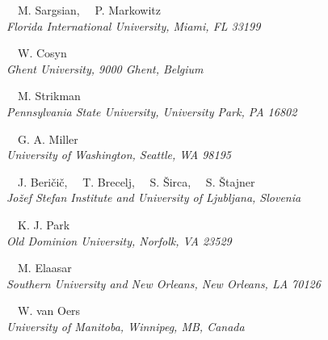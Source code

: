 \begin{center}
\vspace{10px}

{~~M. Sargsian,
~~P. Markowitz}\\
\ls
{\normalsize\it{Florida International University, Miami, FL 33199}}

\vspace{10px}

{~~W. Cosyn}\\
\ls
{\normalsize\it{Ghent University, 9000 Ghent, Belgium}}

\vspace{10px}

{~~M. Strikman}\\
\ls
{\normalsize\it{Pennsylvania State University, University Park, PA 16802}}

\vspace{10px}

{~~G. A. Miller}\\
\ls
{\normalsize\it{University of Washington, Seattle, WA 98195}}

\vspace{10px}

{~~J. Beri\v{c}i\v{c}, 
~~T. Brecelj, 
~~S. \v{S}irca, 
~~S. \v{S}tajner} \\
\ls
{\normalsize\it{Jo\v{z}ef Stefan Institute and University of Ljubljana, Slovenia}}

\vspace{10px}

{~~K. J. Park}\\
\ls
{\normalsize\it{Old Dominion University, Norfolk, VA 23529}}

\vspace{10px}

{~~M. Elaasar}\\
\ls
{\normalsize\it{Southern University and New Orleans, New Orleans, LA 70126}}

\vspace{10px}

{~~W. van Oers}\\
\ls
{\normalsize\it{University of Manitoba, Winnipeg, MB, Canada}}
\ks

%



\end{center}


\setcounter{footnote}{0}
